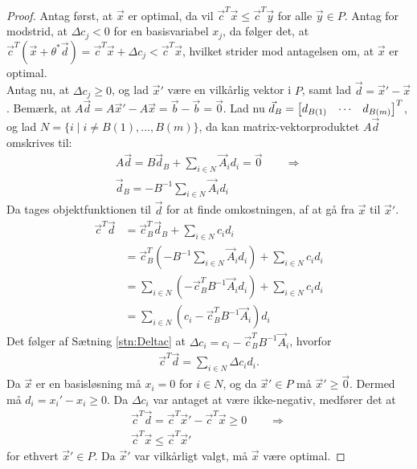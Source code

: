 \begin{proof}
Antag først, at $\vec{x}$ er optimal, da vil $\vec{c}^T\vec{x} \leq \vec{c}^T\vec{y}$ for alle $\vec{y} \in P$. 
Antag for modstrid, at $\Delta c_j < 0$ for en basisvariabel $x_j$, da følger det, at $\vec{c}^T(\vec{x}+\theta^*\vec{d}) = \vec{c}^T\vec{x} + \Delta c_j < \vec{c}^T\vec{x}$, hvilket strider mod antagelsen om, at $\vec{x}$ er optimal.\\

Antag nu, at $\Delta c_j \geq 0$, og lad $\vec{x}'$ være en vilkårlig vektor i $P$, samt lad $\vec{d}=\vec{x}'-\vec{x}$.
Bemærk, at $A\vec{d} = A\vec{x}'- A\vec{x} =  \vec{b} - \vec{b} =\vec{0}$.
Lad nu $\vec{d}_B = \begin{bmatrix} d_{B(1)} & \cdots & d_{B(m)} \end{bmatrix}^T$, og lad $N= \{i \mid i \neq B(1),...,B(m)\}$, da kan matrix-vektorproduktet $A\vec{d}$ omskrives til:
\begin{align*}
	A\vec{d}=
	B\vec{d}_B + \sum_{i \in N} \vec{A}_i d_i = \vec{0} \qquad \Rightarrow
	\\ \vec{d}_B = - B^{-1}\sum_{i \in N} \vec{A}_i d_i
\end{align*}
Da tages objektfunktionen til $\vec{d}$ for at finde omkostningen, af at gå fra $\vec{x}$ til $\vec{x}'$.
\begin{align*}
 \vec{c}^T\vec{d} &= \vec{c}_B^T\vec{d}_B + \sum_{i \in N} c_i d_i 
 \\&= \vec{c}_B^T(- B^{-1}\sum_{i \in N} \vec{A}_i d_i) + \sum_{i \in N} c_i d_i  
 \\&= \sum_{i \in N} (- \vec{c}_B^T B^{-1} \vec{A}_i d_i) +  \sum_{i\in N}c_i d_i 
 \\&= \sum_{i \in N} ( c_i - \vec{c}_B^TB^{-1}\vec{A}_i ) d_i
\end{align*}
Det følger af Sætning \ref{stn:Deltac} at $\Delta c_i = c_i - \vec{c}_B^TB^{-1}\vec{A}_i $, hvorfor
\begin{align*}
\vec{c}^T\vec{d} = \sum_{i \in N} \Delta c_i d_i.
\end{align*}
Da $\vec{x}$ er en basisløsning må $x_i = 0$ for $i \in N$, og da $\vec{x}' \in P$ må $\vec{x}' \geq \vec{0}$. Dermed må $d_i = x_i' - x_i \geq 0$. Da $\Delta c_i$ var antaget at være ikke-negativ, medfører det at
\begin{align*}
\vec{c}^T\vec{d} = \vec{c}^T\vec{x}'-\vec{c}^T\vec{x} \geq 0 \qquad \Rightarrow
\\ \vec{c}^T\vec{x} \leq \vec{c}^T\vec{x}'
\end{align*}
for ethvert $\vec{x}' \in P$. Da $\vec{x}'$ var vilkårligt valgt, må $\vec{x}$ være optimal.
\end{proof}


